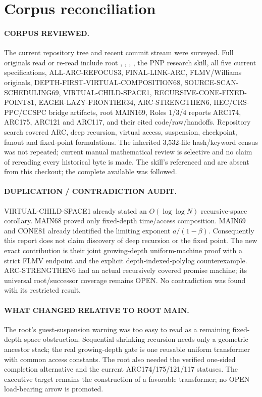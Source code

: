 \documentclass[11pt]{article}
\begin{document}
\section{Corpus reconciliation}
\paragraph{CORPUS REVIEWED.}
The current repository tree and recent commit stream were surveyed.  Full
originals read or re-read include root , ,
, , the PNP research skill,
all five current  specifications, ALL-ARC-REFOCUS3,
FINAL-LINK-ARC, FLMV/Williams originals, DEPTH-FIRST-VIRTUAL-COMPOSITION68,
SOURCE-SCAN-SCHEDULING69, VIRTUAL-CHILD-SPACE1,
RECURSIVE-CONE-FIXED-POINT81, EAGER-LAZY-FRONTIER34,
ARC-STRENGTHEN6, HEC/CRS-PPC/CCSPC bridge artifacts, root MAIN169,
Roles 1/3/4 reports ARC174, ARC175, ARC121 and ARC117, and their cited
code/raw/handoffs.  Repository search covered ARC, deep recursion, virtual
access, suspension, checkpoint, fanout and fixed-point formulations.  The
inherited 3,532-file hash/keyword census was not repeated; current manual
mathematical review is selective and no claim of rereading every historical
byte is made.  The skill's referenced  and
 are absent from this checkout; the
complete available  was followed.

\paragraph{DUPLICATION / CONTRADICTION AUDIT.}
VIRTUAL-CHILD-SPACE1 already stated an $O(\log\log N)$ recursive-space
corollary.  MAIN68 proved only fixed-depth time/access composition.  MAIN69
and CONE81 already identified the limiting exponent $a/(1-\beta)$.
Consequently this report does not claim discovery of deep recursion or the
fixed point.  The new exact contribution is their joint growing-depth
uniform-machine proof with a strict FLMV endpoint and the explicit
depth-indexed-polylog counterexample.  ARC-STRENGTHEN6 had an actual
recursively covered promise machine; its universal root/successor coverage
remains OPEN.  No contradiction was found with its restricted result.

\paragraph{WHAT CHANGED RELATIVE TO ROOT MAIN.}
The root's guest-suspension warning was too easy to read as a remaining
fixed-depth space obstruction.  Sequential shrinking recursion needs only a
geometric ancestor stack; the real growing-depth gate is one reusable uniform
transformer with common access constants.  The root also needed the verified
one-sided completion alternative and the current ARC174/175/121/117 statuses.
The executive target remains the construction of a favorable transformer;
no OPEN load-bearing arrow is promoted.
\end{document}
